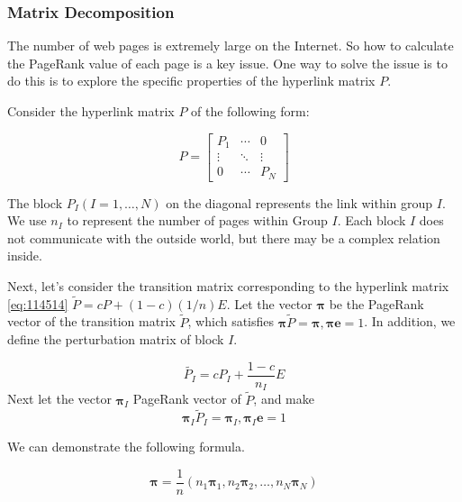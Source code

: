 \documentclass[lettersize,journal,12pt,conference]{IEEEtran}
\begin{document}
\subsubsection{Matrix Decomposition}
The number of web pages is extremely large on the Internet. So how to calculate the PageRank value of each page is a key issue. One way to solve the issue is to do this is to explore the specific properties of the hyperlink matrix $P$.

Consider the hyperlink matrix $P$ of the following form:

\begin{equation}
	\label{eq:114514}
	P=
	\begin{bmatrix}
		P_1    & \cdots & 0      \\
		\vdots & \ddots & \vdots \\
		0      & \cdots & P_N
	\end{bmatrix}
\end{equation}

The block $ P_I (I = 1, \ldots, N)$ on the diagonal represents the link within group $I$. We use $n_I$ to represent the number of pages within Group $I$. Each block $I$ does not communicate with the outside world, but there may be a complex relation inside.

Next, let's consider the transition matrix corresponding to the hyperlink matrix \eqref{eq:114514} $\widetilde{P} = cP  + (1-c)(1/n)E$. Let the vector $\boldsymbol{\pi}$ be the PageRank vector of the transition matrix $\widetilde{P}$, which satisfies $\boldsymbol{\pi}\widetilde{P}=\boldsymbol{\pi}, \boldsymbol{\pi e}=1$. In addition, we define the perturbation matrix of block $I$.

\begin{equation}
	\widetilde{P_I}
	=cP_I + \frac{1-c}{n_I}E
\end{equation}
Next let the vector $\boldsymbol{\pi}_I$
PageRank vector of $\widetilde{P}$, and make
\begin{equation}
	\boldsymbol{\pi}_I\widetilde{P}_I = \boldsymbol{\pi}_I, \boldsymbol{\pi}_I\boldsymbol{e}=1
\end{equation}

We can demonstrate the following formula.

\begin{equation}
	\label{eq:4444}
	\boldsymbol{\pi}=\frac{1}{n}(n_1\boldsymbol{\pi}_1,  n_2\boldsymbol{\pi}_2,\ldots,n_N\boldsymbol{\pi}_N)
\end{equation}
\end{document}
